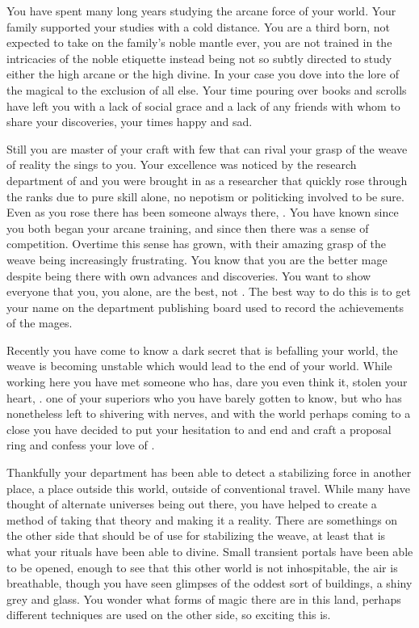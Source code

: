 \documentclass[char]{guildcamp3}
\begin{document}

You have spent many long years studying the arcane force of your world. Your family supported your studies with a cold distance. You are a third born, not expected to take on the family's noble mantle ever, you are not trained in the intricacies of the noble etiquette instead being not so subtly directed to study either the high arcane or the high divine. In your case you dove into the lore of the magical to the exclusion of all else. Your time pouring over books and scrolls have left you with a lack of social grace and a lack of any friends with whom to share your discoveries, your times happy and sad. 

Still you are master of your craft with few that can rival your grasp of the weave of reality the sings to you. Your excellence was noticed by the research department of \bMagicWorld{} and you were brought in as a researcher that quickly rose through the ranks due to pure skill alone, no nepotism or politicking involved to be sure. Even as you rose there has been someone always there, \cMageTwo{\intro}. You have known \cMageTwo{\They} since you both began your arcane training, and since then there was a sense of competition. Overtime this sense has grown, with their amazing grasp of the weave being increasingly frustrating. You know that you are the better mage despite \cMageTwo{\They} being there with \cMageTwo{\Their} own advances and discoveries. You want to show everyone that you, you alone, are the best, not \cMageTwo{\They}. The best way to do this is to get your name on the department publishing board used to record the achievements of the mages. 

Recently you have come to know a dark secret that is befalling your world, the weave is becoming unstable which would lead to the end of your world. While working here you have met someone who has, dare you even think it, stolen your heart, \cNobleOne{\intro}. one of your superiors who you have barely gotten to know, but who has nonetheless left to shivering with nerves, and with the world perhaps coming to a close you have decided to put your hesitation to and end and craft a proposal ring and confess your love of \cNobleOne{}.

Thankfully your department has been able to detect a stabilizing force in another place, a place outside this world, outside of conventional travel. While many have thought of alternate universes being out there, you have helped to create a method of taking that theory and making it a reality. There are somethings on the other side that should be of use for stabilizing the weave, at least that is what your rituals have been able to divine. Small transient portals have been able to be opened, enough to see that this other world is not inhospitable, the air is breathable, though you have seen glimpses of the oddest sort of buildings, a shiny grey and glass. You wonder what forms of magic there are in this land, perhaps different techniques are used on the other side, so exciting this is.
\end{document}
